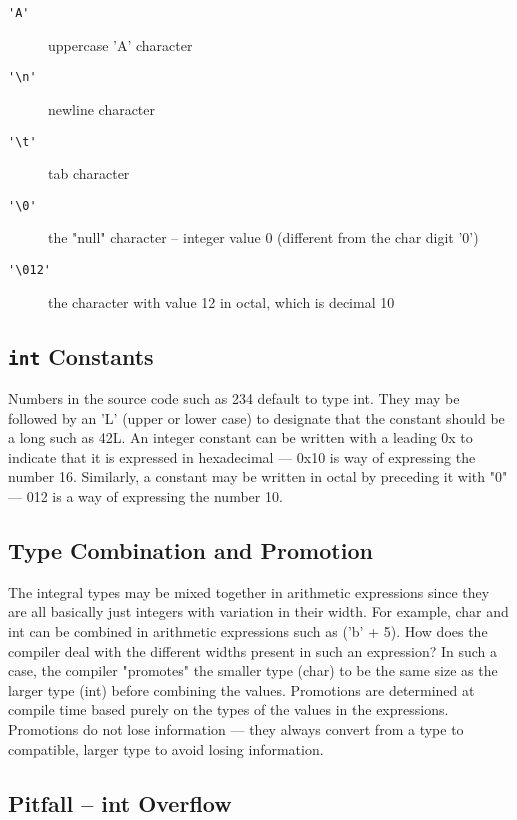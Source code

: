 \begin{description}
\item[\lstinline{'A'}] 
    uppercase 'A' character

\item[\lstinline{'\n'}]
    newline character

\item[\lstinline{'\t'}]
    tab character

\item[\lstinline{'\0'}]
    the "null" character -- integer value 0 (different from the char digit '0')

\item[\lstinline{'\012'}]
    the character with value 12 in octal, which is decimal 10
\end{description}

\subsection{\lstinline{int} Constants}

Numbers in the source code such as 234 default to type int. They may be followed by an 'L' (upper or lower case) to designate that the constant should be a long such as 42L. An integer constant can be written with a leading 0x to indicate that it is expressed in hexadecimal --- 0x10 is way of expressing the number 16. Similarly, a constant may be written in octal by preceding it with "0" --- 012 is a way of expressing the number 10.

\subsection{Type Combination and Promotion}

The integral types may be mixed together in arithmetic expressions since they are all basically just integers with variation in their width. For example, char and int can be combined in arithmetic expressions such as ('b' + 5). How does the compiler deal with the different widths present in such an expression? In such a case, the compiler "promotes" the smaller type (char) to be the same size as the larger type (int) before combining the values. Promotions are determined at compile time based purely on the types of the values in the expressions. Promotions do not lose information --- they always convert from a type to compatible, larger type to avoid losing information.

\subsection{Pitfall -- int Overflow}

